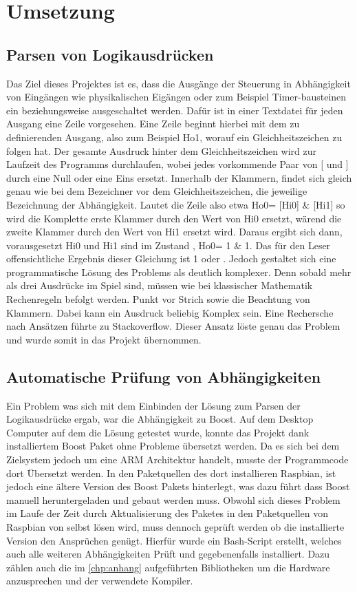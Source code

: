 \section{Umsetzung}\label{kap:ums}


\subsection{Parsen von Logikausdrücken}\label{kap:ums:parsing}
Das Ziel dieses Projektes ist es, dass die Ausgänge der Steuerung in Abhängigkeit von Eingängen wie physikalischen Eigängen oder zum Beispiel Timer-bausteinen ein beziehungsweise ausgeschaltet werden. Dafür ist in einer Textdatei für jeden Ausgang eine Zeile vorgesehen. Eine Zeile beginnt hierbei mit dem zu definierenden Ausgang, also zum Beispiel Ho1, worauf ein Gleichheitszeichen zu folgen hat. Der gesamte Ausdruck hinter dem Gleichheitszeichen wird zur Laufzeit des Programms durchlaufen, wobei jedes vorkommende Paar von [ und ] durch eine Null oder eine Eins ersetzt. Innerhalb der Klammern, findet sich gleich genau wie bei dem Bezeichner vor dem Gleichheitszeichen, die jeweilige Bezeichnung der Abhängigkeit. Lautet die Zeile also etwa Ho0= [Hi0] \& [Hi1] so wird die Komplette erste Klammer durch den Wert von Hi0 ersetzt, wärend die zweite Klammer  durch den Wert von Hi1 ersetzt wird. Daraus ergibt sich dann, vorausgesetzt Hi0 und Hi1 sind im Zustand , Ho0= 1 \& 1. Das für den Leser offensichtliche Ergebnis dieser Gleichung ist 1 oder . Jedoch gestaltet sich eine programmatische Lösung des Problems als deutlich komplexer. Denn sobald mehr als drei Ausdrücke im Spiel sind, müssen wie bei klassischer Mathematik Rechenregeln befolgt werden. Punkt vor Strich sowie die Beachtung von Klammern. Dabei kann ein Ausdruck beliebig Komplex sein. Eine Rechersche nach Ansätzen führte zu Stackoverflow.\cite{URL:Parsing} Dieser Ansatz löste genau das Problem und wurde somit in das Projekt übernommen. 
%
\subsection{Automatische Prüfung von Abhängigkeiten}\label{kap:ums:abh}
Ein Problem was sich mit dem Einbinden der Lösung zum Parsen der Logikausdrücke ergab, war die Abhängigkeit zu Boost. Auf dem Desktop Computer auf dem die Lösung getestet wurde, konnte das Projekt dank installiertem Boost Paket ohne Probleme übersetzt werden. Da es sich bei dem  Zielsystem jedoch um eine ARM Architektur handelt, musste der Programmcode dort Übersetzt werden. In den Paketquellen des dort installieren Raspbian, ist jedoch eine ältere Version des Boost Pakets hinterlegt, was dazu führt dass Boost manuell heruntergeladen und gebaut werden muss. Obwohl sich dieses Problem im Laufe der Zeit durch Aktualisierung des Paketes in den Paketquellen von Raspbian von selbst lösen wird, muss dennoch geprüft werden ob die installierte Version den Ansprüchen genügt. Hierfür wurde ein Bash-Script erstellt, welches auch alle weiteren Abhängigkeiten Prüft und gegebenenfalls installiert. Dazu zählen auch die im  \autoref{chp:anhang} aufgeführten Bibliotheken um die Hardware anzusprechen und der verwendete Kompiler. 
 
